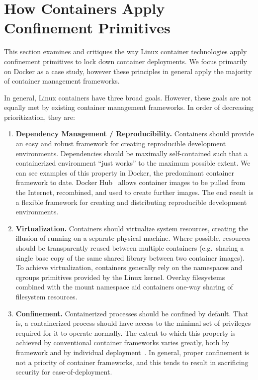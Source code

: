 \section{How Containers Apply Confinement Primitives}%
\label{s:cp-containers}

This section examines and critiques the way Linux container technologies apply confinement
primitives to lock down container deployments. We focus primarily on Docker as a case
study, however these principles in general apply the majority of container management
frameworks.

In general, Linux containers have three broad goals. However, these goals are not
equally met by existing container management frameworks. In order of decreasing
prioritization, they are:
\begin{enumerate}[font=\bfseries]
  \item \textbf{Dependency Management / Reproducibility.}
    Containers should provide an easy and robust framework for creating reproducible
    development environments. Dependencies should be maximally self-contained such that
    a containerized environment \enquote{just works} to the maximum possible extent. We
    can see examples of this property in Docker, the predominant container framework to
    date. Docker Hub~\cite{docker_hub} allows container images to be pulled from the
    Internet, recombined, and used to create further images. The end result is a flexible
    framework for creating and distributing reproducible development environments.

  \item \textbf{Virtualization.}
    Containers should virtualize system resources, creating the illusion of running on
    a separate physical machine. Where possible, resources should be transparently reused
    between multiple containers (e.g.~sharing a single base copy of the same shared
    library between two container images). To achieve virtualization, containers generally
    rely on the namespaces and cgroups primitives provided by the Linux kernel. Overlay
    filesystems~\cite{overlayfs} combined with the mount namespace aid containers one-way
    sharing of filesystem resources.

  \item \textbf{Confinement.}
    Containerized processes should be confined by default. That is, a containerized
    process should have access to the minimal set of privileges required for it to operate
    normally. The extent to which this property is achieved by conventional container
    frameworks varies greatly, both by framework and by individual
    deployment~\cite{sultan2019_container_security, lin2018_container_security,
    bui2015_docker_analysis}. In general, proper confinement is not a priority of
    container frameworks, and this tends to result in sacrificing security for
    ease-of-deployment.
\end{enumerate}


